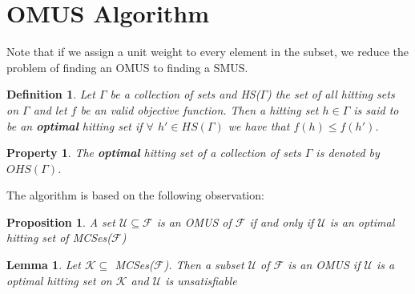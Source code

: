 \documentclass{article}
\newcommand\m[1]{\mathcal{#1}}
\newtheorem{definition}[thm]{Definition}
\newtheorem{property}[prop]{Property}
\newtheorem{lemma}[lem]{Lemma}
\newtheorem{proposition}[propo]{Proposition}
\newcommand\comment[1]{\marginpar{\tiny #1}}
\renewcommand\comment[1]{#1}
\newcommand{\todo}[1]{{\comment{\color{red}\textsc{TODO:}#1}}}
\begin{document}
\section{OMUS Algorithm}

Note that if we assign a unit weight to every element in the subset, we reduce the problem of finding an OMUS to finding a SMUS.

\begin{definition}
  Let $\Gamma$ be a collection of sets and HS($\Gamma$) the set of all hitting sets on $\Gamma$ and let $f$ be an valid objective function. Then a hitting set $ h \in \Gamma$ is said to be an \textbf{optimal} hitting set if $\forall$ $h' \in HS(\Gamma)$ we have that %
  $f(h) \leq f(h')$. %
\end{definition}

\begin{property}
  The \textbf{optimal} hitting set of a collection of sets $\Gamma$ is denoted by $OHS(\Gamma)$.
\end{property}

The algorithm is based on the following observation:

\begin{proposition}\label{prop:optimal-hitting-set}
  A set $\m{U} \subseteq \m{F}$ is an OMUS of $\m{F}$ if and only if $\m{U}$ is an optimal hitting set of MCSes($\m{F}$)
\end{proposition}


\begin{lemma}\label{lemma:K}
  Let $\m{K}  \subseteq$ MCSes($\m{F}$). Then a subset $\m{U}$ of $\m{F}$ is an OMUS if $\m{U}$ is a optimal hitting set on $\m{K}$ and $\m{U}$ is unsatisfiable
\end{lemma}
\end{document}
